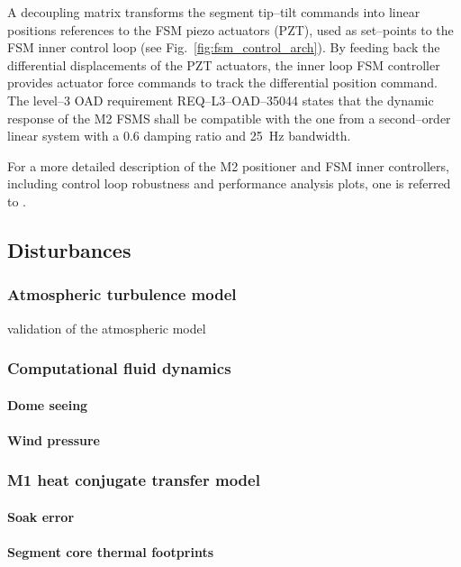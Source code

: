 \documentclass{gmto}
\begin{document}
A decoupling matrix transforms the segment tip--tilt commands into linear positions references to the FSM piezo actuators (PZT), used as set--points to the FSM inner control loop (see Fig.~\ref{fig:fsm_control_arch}). By feeding back the differential displacements of the PZT actuators, the inner loop FSM controller provides actuator force commands to track the differential position command. %
The level--3 OAD requirement REQ--L3--OAD--35044 \cite{OAD} states that the dynamic response of the M2 FSMS shall be compatible with the one from a second--order linear system with a $0.6$ damping ratio and \SI{25}{Hz} bandwidth.


For a more detailed description of the M2 positioner and FSM inner controllers, including control loop robustness and performance analysis plots, one is referred to \cite[Section 4.1 and 4.2]{GMT.DOC.05154}.



\clearpage
\subsection{Disturbances}
\label{sec:disturbances}

\subsubsection{Atmospheric turbulence model}
\label{sec:atm}

validation of the atmospheric model\cite{GMT.DOC.01862}


\subsubsection{Computational fluid dynamics}
\label{sec:cfd}

\paragraph{Dome seeing}

\paragraph{Wind pressure}

\cite{GMTO.DOC.03352}

\subsubsection{M1 heat conjugate transfer model}
\label{sec:m1-hct}

\cite{GMT.DOC.04558,GMT.DOC.04557,GMT.DOC.04894}
\paragraph{Soak error}

\paragraph{Segment core thermal footprints}



\clearpage

\printbibliography
\end{document}
